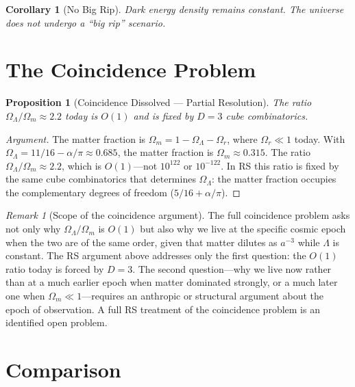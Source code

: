 \documentclass[12pt,a4paper]{article}
\newtheorem{corollary}[theorem]{Corollary}
\newtheorem{proposition}[theorem]{Proposition}
\theoremstyle{definition}
\theoremstyle{remark}
\newtheorem{remark}[theorem]{Remark}
\begin{document}
\begin{corollary}[No Big Rip]
Dark energy density remains constant.  The universe does not
undergo a ``big rip'' scenario.
\end{corollary}

\section{The Coincidence Problem}
\label{sec:coincidence}

\begin{proposition}[Coincidence Dissolved --- Partial Resolution]
The ratio $\Omega_\Lambda/\Omega_m \approx 2.2$ today is $O(1)$ and
is fixed by $D = 3$ cube combinatorics.
\end{proposition}

\begin{proof}[Argument]
The matter fraction is $\Omega_m = 1 - \Omega_\Lambda -
\Omega_r$, where $\Omega_r \ll 1$ today.  With
$\Omega_\Lambda = 11/16 - \alpha/\pi \approx 0.685$,
the matter fraction is $\Omega_m \approx 0.315$.  The ratio
$\Omega_\Lambda/\Omega_m \approx 2.2$, which is $O(1)$---not
$10^{122}$ or $10^{-122}$.  In RS this ratio is fixed by the
same cube combinatorics that determines $\Omega_\Lambda$: the
matter fraction occupies the complementary degrees of freedom
($5/16 + \alpha/\pi$).
\end{proof}

\begin{remark}[Scope of the coincidence argument]
The full coincidence problem asks not only why $\Omega_\Lambda/\Omega_m$
is $O(1)$ but also why we live at the specific cosmic epoch when
the two are of the same order, given that matter dilutes as
$a^{-3}$ while $\Lambda$ is constant.  The RS argument above
addresses only the first question: the $O(1)$ ratio today is
forced by $D=3$.  The second question---why we live now rather
than at a much earlier epoch when matter dominated strongly, or a
much later one when $\Omega_m \ll 1$---requires an anthropic or
structural argument about the epoch of observation.  A full RS
treatment of the coincidence problem is an identified open problem.
\end{remark}

\section{Comparison}
\label{sec:comparison}
\end{document}
